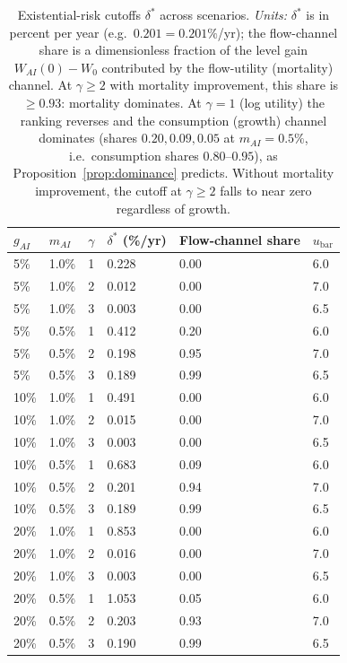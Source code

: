 \documentclass{_latex/house}
\begin{document}
\begin{table}[!ht]
\centering
\begin{tabular}{lll|lll}
\toprule
$g_{AI}$ & $m_{AI}$ & $\gamma$ & $\delta^*$ (\%/yr) & Flow-channel share & $u_\text{bar}$ \\
\midrule
5\%  & 1.0\%  & 1 & 0.228 & 0.00 & 6.0 \\
5\%  & 1.0\%  & 2 & 0.012 & 0.00 & 7.0 \\
5\%  & 1.0\%  & 3 & 0.003 & 0.00 & 6.5 \\
\midrule
5\%  & 0.5\%  & 1 & 0.412 & 0.20 & 6.0 \\
5\%  & 0.5\%  & 2 & 0.198 & 0.95 & 7.0 \\
5\%  & 0.5\%  & 3 & 0.189 & 0.99 & 6.5 \\
\midrule
10\% & 1.0\%  & 1 & 0.491 & 0.00 & 6.0 \\
10\% & 1.0\%  & 2 & 0.015 & 0.00 & 7.0 \\
10\% & 1.0\%  & 3 & 0.003 & 0.00 & 6.5 \\
\midrule
10\% & 0.5\%  & 1 & 0.683 & 0.09 & 6.0 \\
10\% & 0.5\%  & 2 & 0.201 & 0.94 & 7.0 \\
10\% & 0.5\%  & 3 & 0.189 & 0.99 & 6.5 \\
\midrule
20\% & 1.0\%  & 1 & 0.853 & 0.00 & 6.0 \\
20\% & 1.0\%  & 2 & 0.016 & 0.00 & 7.0 \\
20\% & 1.0\%  & 3 & 0.003 & 0.00 & 6.5 \\
\midrule
20\% & 0.5\%  & 1 & 1.053 & 0.05 & 6.0 \\
20\% & 0.5\%  & 2 & 0.203 & 0.93 & 7.0 \\
20\% & 0.5\%  & 3 & 0.190 & 0.99 & 6.5 \\
\bottomrule
\end{tabular}
\caption{Existential-risk cutoffs $\delta^*$ across scenarios. \emph{Units:} $\delta^*$ is in percent per year (e.g.\ $0.201 = 0.201\%$/yr); the flow-channel share is a dimensionless fraction of the level gain $W_{AI}(0)-W_0$ contributed by the flow-utility (mortality) channel. At $\gamma \geq 2$ with mortality improvement, this share is $\geq 0.93$: mortality dominates. At $\gamma = 1$ (log utility) the ranking reverses and the consumption (growth) channel dominates (shares $0.20,0.09,0.05$ at $m_{AI}=0.5\%$, i.e.\ consumption shares $0.80$--$0.95$), as Proposition~\ref{prop:dominance} predicts. Without mortality improvement, the cutoff at $\gamma \geq 2$ falls to near zero regardless of growth.}
\label{tab:cutoffs}
\end{table}
\end{document}
